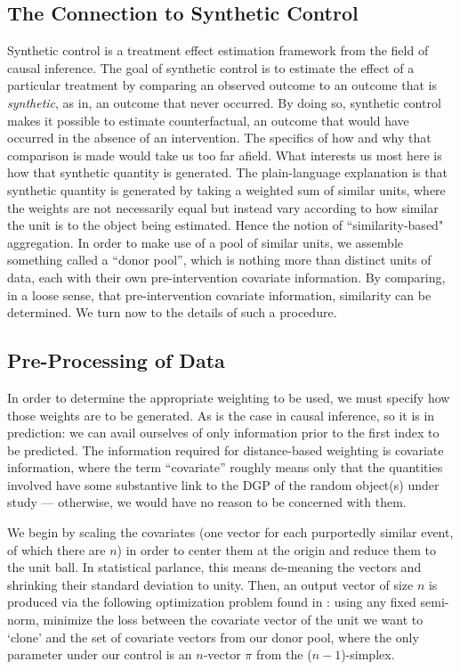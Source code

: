 \documentclass{uiucthesis2021}
\theoremstyle{definition}
\begin{document}
\subsection{The Connection to Synthetic Control}
Synthetic control \cite[][]{abadie2003economic,abadie2010synthetic} is a treatment effect estimation framework from the field of causal inference.  The goal of synthetic control is to estimate the effect of a particular treatment by comparing an observed outcome to an outcome that is \textit{synthetic}, as in, an outcome that never occurred.  By doing so, synthetic control makes it possible to estimate counterfactual, an outcome that would have occurred in the absence of an intervention.  The specifics of how and why that comparison is made would take us too far afield.  What interests us most here is how that synthetic quantity is generated.  The plain-language explanation is that synthetic quantity is generated by taking a weighted sum of similar units, where the weights are not necessarily equal but instead vary according to how similar the unit is to the object being estimated.  Hence the notion of ``similarity-based" aggregation.  In order to make use of a pool of similar units, we assemble something called a ``donor pool'', which is nothing more than distinct units of data, each with their own pre-intervention covariate information.  By comparing, in a loose sense, that pre-intervention covariate information, similarity can be determined.  We turn now to the details of such a procedure.

\subsection{Pre-Processing of Data}
In order to determine the appropriate weighting to be used, we must specify how those weights are to be generated.  As is the case in causal inference, so it is in prediction: we can avail ourselves of only information prior to the first index to be predicted.  The information required for distance-based weighting is covariate information, where the term ``covariate'' roughly means only that the quantities involved have some substantive link to the DGP of the random object(s) under study --- otherwise, we would have no reason to be concerned with them.

We begin by scaling the covariates (one vector for each purportedly similar event, of which there are $n$) in order to center them at the origin and reduce them to the unit ball.  In statistical parlance, this means de-meaning the vectors and shrinking their standard deviation to unity.  Then, an output vector of size $n$ is produced via the following optimization problem found in  \cite[][]{abadie2003economic,abadie2010synthetic}: using any fixed semi-norm, minimize the loss between the covariate vector of the unit we want to `clone' and the set of covariate vectors from our donor pool, where the only parameter under our control is an $n$-vector $\pi$ from the ($n-1$)-simplex.  
\end{document}
